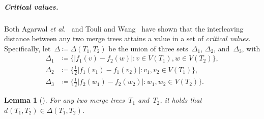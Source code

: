 \documentclass[11pt]{article}
\newtheorem{lemma}[theorem]{Lemma}
\newcommand{\etal}{\emph{et al.}}
\newcommand{\intdist}[1]{d^{{#1}}}
\renewcommand{\mid}{:}
\begin{document}
%
\subparagraph{Critical values.}
Both Agarwal \etal~\cite{agarwal2018computing} and Touli and Wang~\cite{touli2022fpt} have shown that the interleaving distance between any two merge trees attains a value in a set of \emph{critical values}.
Specifically, let~$\Delta \coloneqq \Delta(T_1, T_2)$ be the union of three sets~$\Delta_1$, $\Delta_2$, and~$\Delta_3$, with
\begin{align}\label{eq:critical-values}
	\Delta_1 &\coloneqq \{|f_1(v) - f_2(w)| \mid v \in V(T_1), w \in V(T_2)\},\nonumber\\
	\Delta_2 &\coloneqq \{\tfrac{1}{2} |f_1(v_1) - f_1(v_2)| \mid v_1, v_2 \in V(T_1)\},\\ 
	\Delta_3 &\coloneqq \{\tfrac{1}{2} |f_2(w_1) - f_2(w_2)| \mid w_1, w_2 \in V(T_2)\}.\nonumber
\end{align}
%
\begin{lemma}[\cite{agarwal2018computing, touli2022fpt}]\label{lem:critical-values}
	For any two merge trees~$T_1$ and~$T_2$, it holds that $\intdist{}(T_1, T_2) \in \Delta(T_1, T_2)$.
\end{lemma}
%
\end{document}
